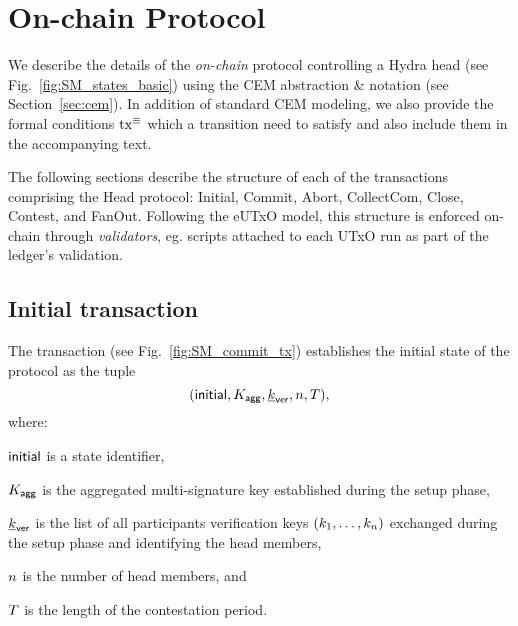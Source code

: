 \section{On-chain Protocol}\label{sec:mainchain}

We describe the details of the \emph{on-chain} protocol controlling a
Hydra head (see Fig.~\ref{fig:SM_states_basic}) using the CEM abstraction \&
notation (see Section~\ref{sec:cem}). In addition of standard CEM modeling, we
also provide the formal conditions $\mathrm{tx}^\equiv$ which a transition need to
satisfy and also include them in the accompanying text.

The following sections describe the structure of each of the transactions comprising 
the Head protocol: Initial, Commit, Abort, CollectCom, Close, Contest, and FanOut. 
Following the eUTxO model, this structure is enforced on-chain through \emph{validators}, eg. scripts attached to each UTxO run as part of the ledger's validation. 



\subsection{Initial transaction} 

The \mtxInit{} transaction (see
Fig.~\ref{fig:SM_commit_tx}) establishes the initial state of the protocol as the tuple
$$
(\mathsf{initial},K_{\mathsf{agg}},\underline{k}_{\mathsf{ver}},n,T),
$$ 
where:
\begin{menumerate}
    \item $\mathsf{initial}$ is
a state identifier, 
   \item $K_{\mathsf{agg}}$ is the aggregated multi-signature key established
during the setup phase, 
  \item $\underline{k}_{\mathsf{ver}}$ is the list of all participants verification
keys $(k_1,\ldots,k_n)$ exchanged during the setup phase and identifying the
head members, 
  \item $n$ is the number of head members, and 
  \item $T$ is the length of the contestation period.
\end{menumerate} 


